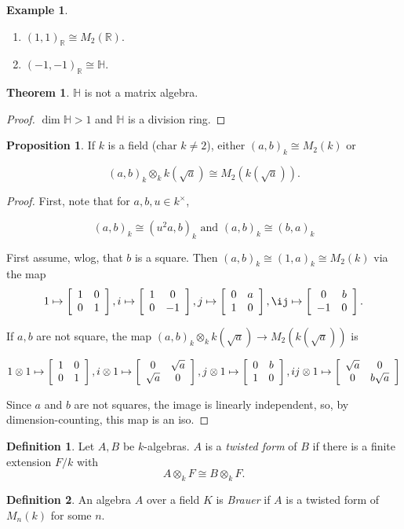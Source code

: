 \documentclass{article}
\newcommand{\R}{\mathbb R}
\newcommand{\HH}{\mathbb H}
\newcommand{\ttm}[4]{\left[
  \begin{array}{ c c }
     #1 & #2 \\
     #3 & #4
  \end{array} \right]}
\newcommand{\ut}[1]{{#1}^\times}
\theoremstyle{definition}
\newtheorem*{prop}{Proposition}
\newtheorem*{thm}{Theorem}
\newtheorem*{example}{Example}
\newtheorem*{defn}{Definition}
\begin{document}
\begin{example}
  \begin{enumerate}
  \item $(1,1)_\R \cong M_2(\R)$. 
  \item $(-1,-1)_\R \cong \HH$.
  \end{enumerate}
\end{example}

\begin{thm}
 $\HH$ is not a matrix algebra. 
\end{thm}
\begin{proof}
 $\dim\HH>1$ and $\HH$ is a division ring. 
\end{proof}

\begin{prop}
  If $k$ is a field ($\text{char }k\neq 2$), either $(a,b)_k\cong M_2(k)$ or

  $$(a,b)_k\otimes_k k(\sqrt a) \cong M_2(k(\sqrt a)).$$
\end{prop}
\begin{proof}
  First, note that for $a,b,u\in\ut k$,

  $$(a,b)_k\cong(u^2a, b)_k \text{ and } (a,b)_k \cong (b,a)_k$$

  First assume, wlog, that $b$ is a square. Then $(a,b)_k \cong (1,a)_k \cong
  M_2(k)$ via the map
  $$1\mapsto\ttm 1 0 0 1, i\mapsto\ttm 1 0 0 {-1}, j\mapsto\ttm 0 a 1 0,
  \ij\mapsto \ttm 0 b {-1} 0.$$

  If $a,b$ are not square, the map $(a,b)_k\otimes_k k(\sqrt a) \to M_2(k(\sqrt
  a))$ is

  $$1\otimes 1\mapsto\ttm 1 0 0 1,
  i\otimes 1\mapsto\ttm 0 {\sqrt a} {\sqrt a} 0, 
  j\otimes 1\mapsto\ttm 0 b 1 0, 
  ij\otimes 1\mapsto\ttm {\sqrt a} 0 0 {b\sqrt a}$$

  Since $a$ and $b$ are not squares, the image is linearly independent, so, by
  dimension-counting, this map is an iso.
\end{proof}

\begin{defn}
 Let $A,B$ be $k$-algebras. $A$ is a \textit{twisted form} of $B$ if there is a finite
 extension $F/k$ with
 $$A\otimes_k F \cong B\otimes_k F.$$
\end{defn}

\begin{defn}
 An algebra $A$ over a field $K$ is \textit{Brauer} if $A$ is a twisted form of
 $M_n(k)$ for some $n$. 
\end{defn}
\end{document}
